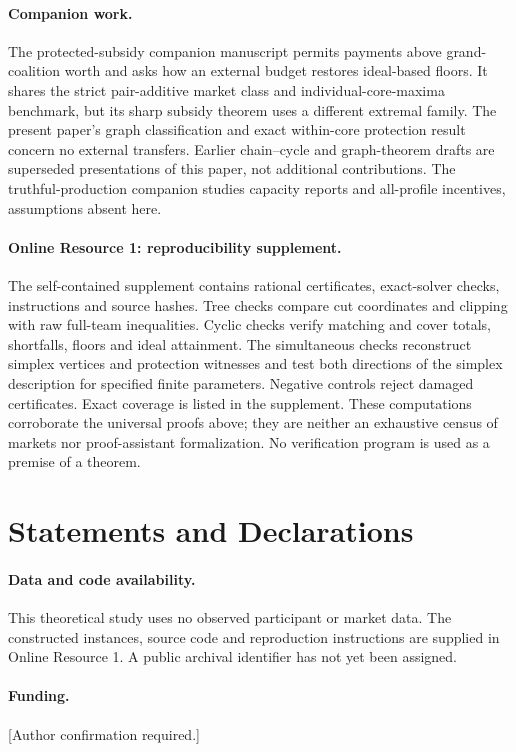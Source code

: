 \documentclass[11pt]{article}
\theoremstyle{remark}\newtheorem{remark}[theorem]{Remark}
\begin{document}
\paragraph{Companion work.}
The protected-subsidy companion manuscript permits payments above grand-coalition
worth and asks how an external budget restores ideal-based floors. It shares
the strict pair-additive market class and individual-core-maxima benchmark,
but its sharp subsidy theorem uses a different extremal family. The present
paper's graph classification and exact within-core protection result concern
no external transfers. Earlier
chain--cycle and graph-theorem drafts are superseded presentations of this
paper, not additional contributions. The truthful-production companion studies
capacity reports and all-profile incentives, assumptions absent here.

\paragraph{Online Resource 1: reproducibility supplement.}
The self-contained supplement contains rational certificates, exact-solver
checks, instructions and source hashes. Tree checks compare cut coordinates
and clipping with raw full-team inequalities. Cyclic checks verify matching
and cover totals, shortfalls, floors and ideal attainment. The simultaneous
checks reconstruct simplex vertices and protection witnesses and test both
directions of the simplex description for specified finite parameters.
Negative controls reject damaged certificates. Exact coverage is listed in
the supplement. These computations corroborate the universal proofs above;
they are neither an exhaustive census of markets nor proof-assistant
formalization. No verification program is used as a premise of a theorem.

\section*{Statements and Declarations}
\paragraph{Data and code availability.}
This theoretical study uses no observed participant or market data. The
constructed instances, source code and reproduction instructions are supplied
in Online Resource 1. A public archival identifier has not yet been assigned.
\paragraph{Funding.} [Author confirmation required.]
\end{document}
